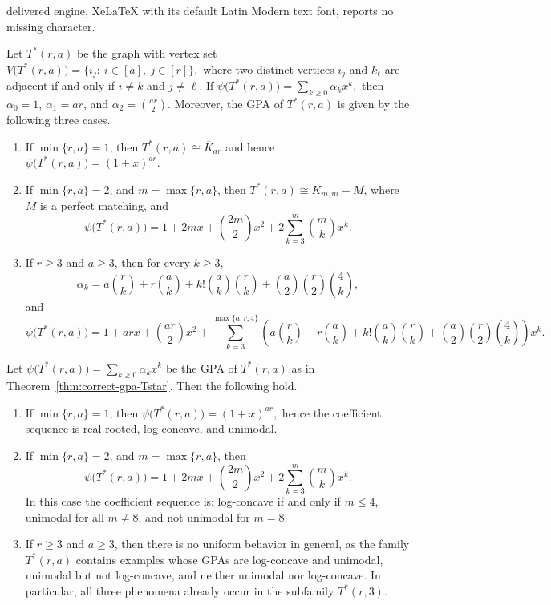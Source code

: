 \documentclass[10pt,a4paper]{amsart}
\begin{document}
delivered engine, XeLaTeX with its default Latin Modern text font, reports no missing character.
		\begin{theorem}\label{thm:correct-gpa-Tstar}
			Let $T^*(r,a)$ be the graph with vertex set
			$
			V\bigl(T^*(r,a)\bigr)=\{ i_j:\ i\in [a],\ j\in [r] \},
			$
			where two distinct vertices $i_j$ and $k_\ell$ are adjacent if and only if
			$
			i\neq k $ and $ j\neq \ell.
			$
		If $\psi\bigl(T^*(r,a)\bigr)=\sum_{k\ge 0}\alpha_k x^k,$ then $\alpha_0=1$, $\alpha_1=ar$, and
			$
			\alpha_2=\binom{ar}{2}.
			$
			Moreover, the  GPA of $T^*(r,a)$ is given by the following three cases.
			\begin{enumerate}[label=\textup{(\roman*)}]
				\item If $\min\{r,a\}=1$, then $T^*(r,a)\cong \overline{K}_{ar}$ and hence
			$\psi\bigl(T^*(r,a)\bigr)=(1+x)^{ar}. $
			\item If $\min\{r,a\}=2$, and $m=\max\{r,a\}$, then $T^*(r,a)\cong K_{m,m}-M$, where $M$ is a perfect matching, and
			$$
			\psi\bigl(T^*(r,a)\bigr)
			=
			1+2mx+\binom{2m}{2}x^2+2\sum_{k=3}^{m}\binom{m}{k}x^k.
			$$
			\item If $r\ge 3$ and $a\ge 3$, then for every $k\ge 3$,
			$$
			\alpha_k
			=
			a\binom{r}{k}
			+
			r\binom{a}{k}
			+
			k!\binom{a}{k}\binom{r}{k}
			+
			\binom{a}{2}\binom{r}{2}\binom{4}{k},
			$$
			and
			{\footnotesize$$
			\psi\bigl(T^*(r,a)\bigr)
			=
			1+arx+\binom{ar}{2}x^2
			+
			\sum_{k=3}^{\max\{a,r,4\}}
			\left(
			a\binom{r}{k}
			+
			r\binom{a}{k}
			+
			k!\binom{a}{k}\binom{r}{k}
			+
			\binom{a}{2}\binom{r}{2}\binom{4}{k}
			\right)x^k.
			$$}
			\end{enumerate}
		\end{theorem}

		\begin{theorem}\label{thm:Tstar-shape}
			Let $\psi\bigl(T^*(r,a)\bigr)=\sum_{k\ge 0}\alpha_kx^k$	be the  GPA of $T^*(r,a)$ as in Theorem~\ref{thm:correct-gpa-Tstar}. Then the following hold. 
			\begin{enumerate}[label=\textup{(\roman*)}]
				\item If $\min\{r,a\}=1$, then $\psi\bigl(T^*(r,a)\bigr)=(1+x)^{ar},$ hence the coefficient sequence is real-rooted, log-concave, and unimodal.
				
				\item If $\min\{r,a\}=2$, and $m=\max\{r,a\}$, then
				$$
				\psi\bigl(T^*(r,a)\bigr)
				=
				1+2mx+\binom{2m}{2}x^2+2\sum_{k=3}^{m}\binom{m}{k}x^k.
				$$
				In this case the coefficient sequence is: log-concave if and only if $m\le 4$,  unimodal for all $m\neq 8$, and   not unimodal for $m=8$.
				
				\item If $r\ge 3$ and $a\ge 3$, then there is no uniform behavior in general, as the family $T^*(r,a)$ contains examples whose  GPAs are log-concave and unimodal,  unimodal but not log-concave, and  neither unimodal nor log-concave. In particular, all three phenomena already occur in the subfamily $T^*(r,3)$.
			\end{enumerate}
		\end{theorem}
\end{document}

